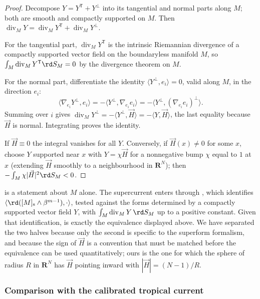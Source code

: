 \begin{proof}
Decompose $Y=Y^{\mathsf T}+Y^{\perp}$ into its tangential and normal parts
along $M$; both are smooth and compactly supported on $M$.  Then
$\operatorname{div}_MY=\operatorname{div}_MY^{\mathsf T}
+\operatorname{div}_MY^{\perp}$.

For the tangential part, $\operatorname{div}_MY^{\mathsf T}$ is the intrinsic
Riemannian divergence of a compactly supported vector field on the
boundaryless manifold $M$, so
$\int_M\operatorname{div}_MY^{\mathsf T}\rd S_M=0$ by the divergence theorem
on $M$.

For the normal part, differentiate the identity
$\langle Y^{\perp},e_i\rangle=0$, valid along $M$, in the direction $e_i$:
\[
 \langle\nabla_{e_i}Y^{\perp},e_i\rangle
 =-\langle Y^{\perp},\nabla_{e_i}e_i\rangle
 =-\bigl\langle Y^{\perp},(\nabla_{e_i}e_i)^{\perp}\bigr\rangle .
\]
Summing over $i$ gives
$\operatorname{div}_MY^{\perp}=-\langle Y^{\perp},\vec H\rangle
=-\langle Y,\vec H\rangle$, the last equality because $\vec H$ is normal.
Integrating proves the identity.

If $\vec H\equiv0$ the integral vanishes for all $Y$.  Conversely, if
$\vec H(x)\ne0$ for some $x$, choose $Y$ supported near $x$ with
$Y=\chi\vec H$ for a nonnegative bump $\chi$ equal to $1$ at $x$ (extending
$\vec H$ smoothly to a neighbourhood in $\mathbf R^N$); then
$-\int_M\chi|\vec H|^2\rd S_M<0$.
\end{proof}

\begin{remark}
\label{rem:ch14-berndtsson-import}
 is a statement about $M$ alone.  The
supercurrent enters through \cite[Corollary~5.2]{Ber19Super}, which
identifies $\langle \rd([M]_{\mathrm s}\wedge\beta^{m-1}),\cdot\rangle$, tested
against the forms determined by a compactly supported vector field $Y$, with
$\int_M\operatorname{div}_MY\,\rd S_M$ up to a positive constant.  Given
that identification,  is exactly the
equivalence displayed above.  We have separated the two halves because only
the second is specific to the superform formalism, and because the sign of
$\vec H$ is a convention that must be matched before the equivalence can be
used quantitatively; ours is the one for which the sphere of radius $R$ in
$\mathbf R^N$ has $\vec H$ pointing inward with $|\vec H|=(N-1)/R$.
\end{remark}

\subsubsection{Comparison with the calibrated tropical current}

